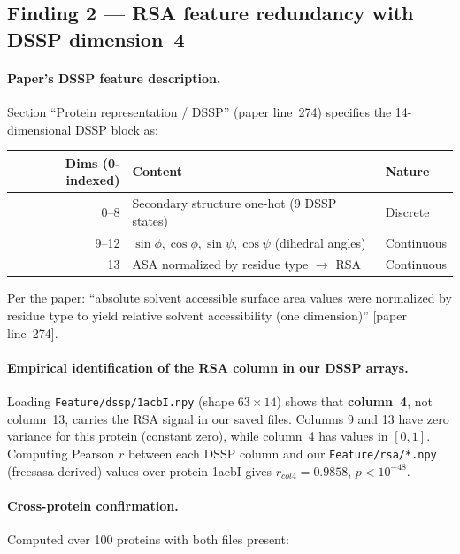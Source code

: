 \documentclass[10pt, a4paper]{article}
\newcommand{\code}[1]{\texttt{\small #1}}
\begin{document}
\subsection{Finding 2 --- RSA feature redundancy with DSSP dimension~4}

\paragraph{Paper's DSSP feature description.}
Section ``Protein representation / DSSP'' (paper line~274) specifies the 14-dimensional
DSSP block as:

\begin{center}
\small
\begin{tabular}{rll}
\toprule
\textbf{Dims (0-indexed)} & \textbf{Content} & \textbf{Nature} \\
\midrule
0--8   & Secondary structure one-hot (9 DSSP states)         & Discrete   \\
9--12  & $\sin\phi,\cos\phi,\sin\psi,\cos\psi$ (dihedral angles) & Continuous \\
13     & ASA normalized by residue type $\to$ RSA             & Continuous \\
\bottomrule
\end{tabular}
\end{center}

\noindent
Per the paper: ``absolute solvent accessible surface area values were normalized by
residue type to yield relative solvent accessibility (one dimension)'' [paper line~274].

\paragraph{Empirical identification of the RSA column in our DSSP arrays.}
Loading \code{Feature/dssp/1acbI.npy} (shape $63\times14$) shows that \textbf{column~4},
not column~13, carries the RSA signal in our saved files. Columns 9 and 13 have zero
variance for this protein (constant zero), while column~4 has values in $[0,1]$.
Computing Pearson $r$ between each DSSP column and our \code{Feature/rsa/*.npy}
(freesasa-derived) values over protein 1acbI gives $r_{col4} = 0.9858$, $p < 10^{-48}$.

\paragraph{Cross-protein confirmation.}
Computed over 100 proteins with both files present:
\end{document}
